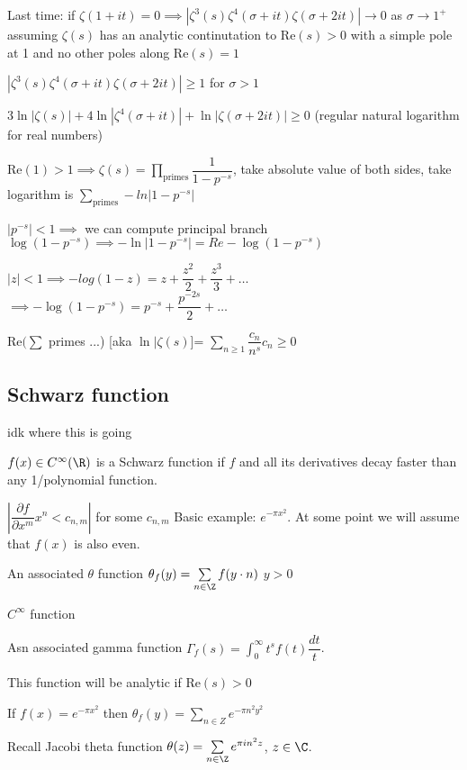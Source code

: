 \documentclass[twoside, 10pt]{article}
\renewcommand{\Re}{\text{Re}}
\begin{document}
Last time: if $\zeta(1 + it) = 0 \implies |\zeta^3(s)\zeta^4(\sigma + it)\zeta(\sigma + 2it)| \to 0$ as $\sigma \to 1^+$ assuming $\zeta(s)$ has an analytic continutation to $\Re(s) > 0$ with a simple pole at 1 and no other poles along $\Re(s) = 1$

$|\zeta^3(s)\zeta^4(\sigma + it)\zeta(\sigma + 2it)| \geq 1$ for $\sigma > 1$

$3\ln|\zeta(s)| + 4\ln|\zeta^4(\sigma + it)| + \ln|\zeta(\sigma + 2it)| \geq 0$ (regular natural logarithm for real numbers)

$\Re(1) > 1 \implies \zeta(s) = \prod\limits_{\text{primes}} \dfrac{1}{1 - p^{-s}}$, take absolute value of both sides, take logarithm is $\sum\limits_{\text{primes}}-ln|1 - p^{-s}|$

$|p^{-s}| < 1 \implies$ we can compute principal branch $\log(1 - p^{-s}) \implies -\ln|1-p^{-s}| = Re - \log(1 - p^{-s})$

$|z| < 1 \implies -log(1 - z) = z + \dfrac{z^2}{2} + \dfrac{z^3}{3} + \ldots$
$\implies -\log(1 - p^{-s}) = p^{-s} + \dfrac{p^{-2s}}{2} + \ldots$

$\Re(\sum$ primes ...) [aka $\ln|\zeta(s)$]= $\sum\limits_{n \geq 1} \dfrac{c_n}{n^s} c_n \geq 0$

\subsection{Schwarz function} idk where this is going

$f(x) \in C^\infty (\R)$ is a Schwarz function if $f$ and all its derivatives decay faster than any 1/polynomial function.

$| \dfrac{\partial f}{\partial x^m} x^n < c_{n, m}|$ for some $c_{n, m}$ Basic example: $e^{-\pi x^2}$. At some point we will assume that $f(x)$ is also even.

\begin{defn}
   An associated $\theta$ function $\theta_f(y) = \sum\limits_{n \in \Z}f(y \cdot n)$ $y > 0$
\end{defn}
$C^\infty$ function

\begin{defn}
   Asn associated gamma function $\Gamma_f(s) = \int_0^\infty t^s f(t) \dfrac{dt}{t}$.
\end{defn}
This function will be analytic if $\Re(s) > 0$

If $f(x) = e^{-\pi x^2}$ then $\theta_f(y) = \sum\limits_{n \in Z} e^{-\pi n^2 y^2}$

Recall Jacobi theta function $\theta(z) = \sum\limits_{n \in \Z} e^{\pi i n^2 z}$, $z\in \C$.
\end{document}
